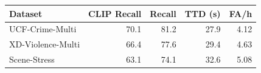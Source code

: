 \begin{tabular}{lrrrr}
\toprule
Dataset & CLIP Recall & \method{} Recall & \method{} TTD (s) & \method{} FA/h \\
\midrule
UCF-Crime-Multi & 70.1 & 81.2 & 27.9 & 4.12 \\
XD-Violence-Multi & 66.4 & 77.6 & 29.4 & 4.63 \\
Scene-Stress & 63.1 & 74.1 & 32.6 & 5.08 \\
\bottomrule
\end{tabular}
